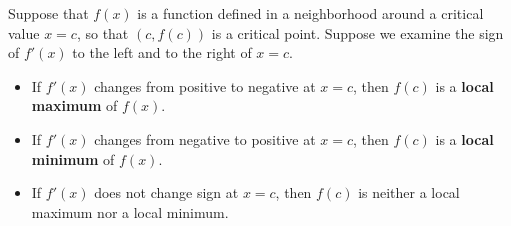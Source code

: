 \begin{theorem}
Suppose that $f(x)$ is a function defined in a neighborhood around a critical value $x=c$, so that $(c, f(c))$ is a critical point. Suppose we examine the sign of $f'(x)$ to the left and to the right of $x=c$. 
    \begin{itemize}
    \item If $f'(x)$ changes from positive to negative at $x=c$, then $f(c)$ is a {\bf local maximum} of $f(x)$.
    \item If $f'(x)$ changes from negative to positive at $x=c$, then $f(c)$ is a {\bf local minimum} of $f(x)$.
    \item If $f'(x)$ does not change sign at $x=c$, then $f(c)$ is neither a local maximum nor a local minimum.
    \end{itemize}
\end{theorem}
